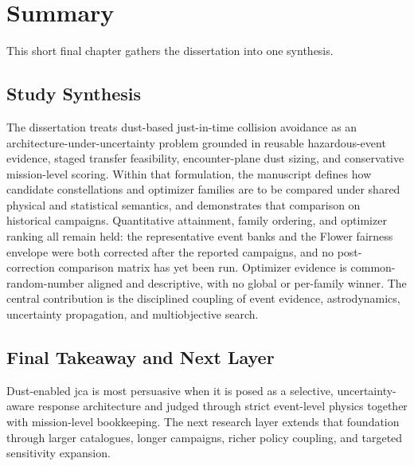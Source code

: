 \chapter{Summary} \label{ch:summary}

This short final chapter gathers the dissertation into one synthesis.

\section{Study Synthesis}

The dissertation treats dust-based just-in-time collision avoidance as an architecture-under-uncertainty problem grounded in reusable hazardous-event evidence, staged transfer feasibility, encounter-plane dust sizing, and conservative mission-level scoring. Within that formulation, the manuscript defines how candidate constellations and optimizer families are to be compared under shared physical and statistical semantics, and demonstrates that comparison on historical campaigns. Quantitative attainment, family ordering, and optimizer ranking all remain held: the representative event banks and the Flower fairness envelope were both corrected after the reported campaigns, and no post-correction comparison matrix has yet been run. Optimizer evidence is common-random-number aligned and descriptive, with no global or per-family winner. The central contribution is the disciplined coupling of event evidence, astrodynamics, uncertainty propagation, and multiobjective search.

\section{Final Takeaway and Next Layer}

Dust-enabled \gls{jca} is most persuasive when it is posed as a selective, uncertainty-aware response architecture and judged through strict event-level physics together with mission-level bookkeeping. The next research layer extends that foundation through larger catalogues, longer campaigns, richer policy coupling, and targeted sensitivity expansion.
